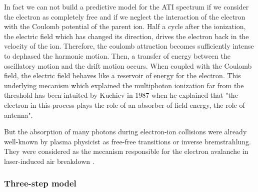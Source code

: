 \documentclass[a4paper]{article}
\begin{document}
\par
In fact we can not build a predictive model for the ATI spectrum if we consider the electron as completely free and if we neglect the interaction of the electron with the Coulomb potential of the parent ion. Half a cycle after the ionization, the electric field which has changed its direction, drives the electron back in the velocity of the ion. Therefore, the coulomb attraction becomes sufficiently intense to dephased the harmonic motion. Then, a transfer of energy between the oscillatory motion and the drift motion occurs. When coupled with the Coulomb field, the electric field behaves like a reservoir of energy for the electron. This underlying mecanism which explained the multiphoton ionization far from the threshold has been intuited by Kuchiev in 1987 \cite{Kuchiev_1987} when he explained that "the electron in this process plays the role of an absorber of field energy, the role of antenna". 
\par
But the absorption of many photons during electron-ion collisions were already well-known by plasma physicist as free-free transitions or inverse bremstrahlung. They were considered as the mecanism responsible for the electron avalanche in laser-induced air breakdown \cite{Chin_2004}.

\subsubsection{Three-step model}
\label{3stepmodel_ATI}
\end{document}
